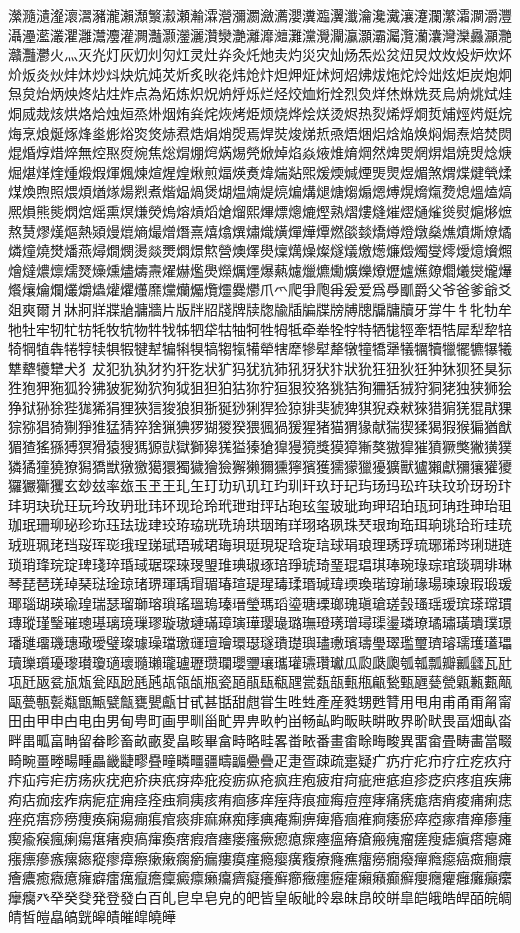 瀠瀡瀢瀣瀤瀥瀦瀧瀨瀩瀪瀫瀬瀭瀮瀯瀰瀱瀲瀳瀴瀵瀶瀷瀸瀹瀺瀻瀼瀽瀾瀿灀灁灂灃灄灅灆灇灈灉灊灋灌灍灎灏灐灑灒灓灔灕灖灗灘灙灚灛灜灝灞灟灠灡灢灣灤灥灦灧灨灩灪火灬灭灮灯灰灱灲灳灴灵灶灷灸灹灺灻灼災灾灿炀炁炂炃炄炅炆炇炈炉炊炋炌炍炎炏炐炑炒炓炔炕炖炗炘炙炚炛炜炝炞炟炠炡炢炣炤炥炦炧炨炩炪炫炬炭炮炯炰炱炲炳炴炵炶炷炸点為炻炼炽炾炿烀烁烂烃烄烅烆烇烈烉烊烋烌烍烎烏烐烑烒烓烔烕烖烗烘烙烚烛烜烝烞烟烠烡烢烣烤烥烦烧烨烩烪烫烬热烮烯烰烱烲烳烴烵烶烷烸烹烺烻烼烽烾烿焀焁焂焃焄焅焆焇焈焉焊焋焌焍焎焏焐焑焒焓焔焕焖焗焘焙焚焛焜焝焞焟焠無焢焣焤焥焦焧焨焩焪焫焬焭焮焯焰焱焲焳焴焵然焷焸焹焺焻焼焽焾焿煀煁煂煃煄煅煆煇煈煉煊煋煌煍煎煏煐煑煒煓煔煕煖煗煘煙煚煛煜煝煞煟煠煡煢煣煤煥煦照煨煩煪煫煬煭煮煯煰煱煲煳煴煵煶煷煸煹煺煻煼煽煾煿熀熁熂熃熄熅熆熇熈熉熊熋熌熍熎熏熐熑熒熓熔熕熖熗熘熙熚熛熜熝熞熟熠熡熢熣熤熥熦熧熨熩熪熫熬熭熮熯熰熱熲熳熴熵熶熷熸熹熺熻熼熽熾熿燀燁燂燃燄燅燆燇燈燉燊燋燌燍燎燏燐燑燒燓燔燕燖燗燘燙燚燛燜燝燞營燠燡燢燣燤燥燦燧燨燩燪燫燬燭燮燯燰燱燲燳燴燵燶燷燸燹燺燻燼燽燾燿爀爁爂爃爄爅爆爇爈爉爊爋爌爍爎爏爐爑爒爓爔爕爖爗爘爙爚爛爜爝爞爟爠爡爢爣爤爥爦爧爨爩爪爫爬爭爮爯爰爱爲爳爴爵父爷爸爹爺爻爼爽爾爿牀牁牂牃牄牅牆片版牉牊牋牌牍牎牏牐牑牒牓牔牕牖牗牘牙牚牛牜牝牞牟牠牡牢牣牤牥牦牧牨物牪牫牬牭牮牯牰牱牲牳牴牵牶牷牸特牺牻牼牽牾牿犀犁犂犃犄犅犆犇犈犉犊犋犌犍犎犏犐犑犒犓犔犕犖犗犘犙犚犛犜犝犞犟犠犡犢犣犤犥犦犧犨犩犪犫犬犭犮犯犰犱犲犳犴犵状犷犸犹犺犻犼犽犾犿狀狁狂狃狄狅狆狇狈狉狊狋狌狍狎狏狐狑狒狓狔狕狖狗狘狙狚狛狜狝狞狟狠狡狢狣狤狥狦狧狨狩狪狫独狭狮狯狰狱狲狳狴狵狶狷狸狹狺狻狼狽狾狿猀猁猂猃猄猅猆猇猈猉猊猋猌猍猎猏猐猑猒猓猔猕猖猗猘猙猚猛猜猝猞猟猠猡猢猣猤猥猦猧猨猩猪猫猬猭献猯猰猱猲猳猴猵猶猷猸猹猺猻猼猽猾猿獀獁獂獃獄獅獆獇獈獉獊獋獌獍獎獏獐獑獒獓獔獕獖獗獘獙獚獛獜獝獞獟獠獡獢獣獤獥獦獧獨獩獪獫獬獭獮獯獰獱獲獳獴獵獶獷獸獹獺獻獼獽獾獿玀玁玂玃玄玅玆率玈玉玊王玌玍玎玏玐玑玒玓玔玕玖玗玘玙玚玛玜玝玞玟玠玡玢玣玤玥玦玧玨玩玪玫玬玭玮环现玱玲玳玴玵玶玷玸玹玺玻玼玽玾玿珀珁珂珃珄珅珆珇珈珉珊珋珌珍珎珏珐珑珒珓珔珕珖珗珘珙珚珛珜珝珞珟珠珡珢珣珤珥珦珧珨珩珪珫珬班珮珯珰珱珲珳珴珵珶珷珸珹珺珻珼珽現珿琀琁琂球琄琅理琇琈琉琊琋琌琍琎琏琐琑琒琓琔琕琖琗琘琙琚琛琜琝琞琟琠琡琢琣琤琥琦琧琨琩琪琫琬琭琮琯琰琱琲琳琴琵琶琷琸琹琺琻琼琽琾琿瑀瑁瑂瑃瑄瑅瑆瑇瑈瑉瑊瑋瑌瑍瑎瑏瑐瑑瑒瑓瑔瑕瑖瑗瑘瑙瑚瑛瑜瑝瑞瑟瑠瑡瑢瑣瑤瑥瑦瑧瑨瑩瑪瑫瑬瑭瑮瑯瑰瑱瑲瑳瑴瑵瑶瑷瑸瑹瑺瑻瑼瑽瑾瑿璀璁璂璃璄璅璆璇璈璉璊璋璌璍璎璏璐璑璒璓璔璕璖璗璘璙璚璛璜璝璞璟璠璡璢璣璤璥璦璧璨璩璪璫璬璭璮璯環璱璲璳璴璵璶璷璸璹璺璻璼璽璾璿瓀瓁瓂瓃瓄瓅瓆瓇瓈瓉瓊瓋瓌瓍瓎瓏瓐瓑瓒瓓瓔瓕瓖瓗瓘瓙瓚瓛瓜瓝瓞瓟瓠瓡瓢瓣瓤瓥瓦瓧瓨瓩瓪瓫瓬瓭瓮瓯瓰瓱瓲瓳瓴瓵瓶瓷瓸瓹瓺瓻瓼瓽瓾瓿甀甁甂甃甄甅甆甇甈甉甊甋甌甍甎甏甐甑甒甓甔甕甖甗甘甙甚甛甜甝甞生甠甡產産甤甥甦甧用甩甪甫甬甭甮甯田由甲申甴电甶男甸甹町画甼甽甾甿畀畁畂畃畄畅畆畇畈畉畊畋界畍畎畏畐畑畒畓畔畕畖畗畘留畚畛畜畝畞畟畠畡畢畣畤略畦畧畨畩番畫畬畭畮畯異畱畲畳畴畵當畷畸畹畺畻畼畽畾畿疀疁疂疃疄疅疆疇疈疉疊疋疌疍疎疏疐疑疒疓疔疕疖疗疘疙疚疛疜疝疞疟疠疡疢疣疤疥疦疧疨疩疪疫疬疭疮疯疰疱疲疳疴疵疶疷疸疹疺疻疼疽疾疿痀痁痂痃痄病痆症痈痉痊痋痌痍痎痏痐痑痒痓痔痕痖痗痘痙痚痛痜痝痞痟痠痡痢痣痤痥痦痧痨痩痪痫痬痭痮痯痰痱痲痳痴痵痶痷痸痹痺痻痼痽痾痿瘀瘁瘂瘃瘄瘅瘆瘇瘈瘉瘊瘋瘌瘍瘎瘏瘐瘑瘒瘓瘔瘕瘖瘗瘘瘙瘚瘛瘜瘝瘞瘟瘠瘡瘢瘣瘤瘥瘦瘧瘨瘩瘪瘫瘬瘭瘮瘯瘰瘱瘲瘳瘴瘵瘶瘷瘸瘹瘺瘻瘼瘽瘾瘿癀癁療癃癄癅癆癇癈癉癊癋癌癍癎癏癐癑癒癓癔癕癖癗癘癙癚癛癜癝癞癟癠癡癢癣癤癥癦癧癨癩癪癫癬癭癮癯癰癱癲癳癴癵癶癷癸癹発登發白百癿皀皁皂皃的皅皆皇皈皉皊皋皌皍皎皏皐皑皒皓皔皕皖皗皘皙皚皛皜皝皞皟皠皡皢皣